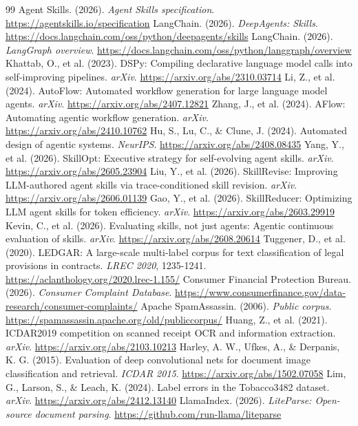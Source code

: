 \documentclass[9pt,a4paper,twocolumn]{article}
\begin{document}
\begin{thebibliography}{99}
 Agent Skills. (2026). \emph{Agent Skills specification}. \url{https://agentskills.io/specification}
 LangChain. (2026). \emph{DeepAgents: Skills}. \url{https://docs.langchain.com/oss/python/deepagents/skills}
 LangChain. (2026). \emph{LangGraph overview}. \url{https://docs.langchain.com/oss/python/langgraph/overview}
 Khattab, O., et al. (2023). DSPy: Compiling declarative language model calls into self-improving pipelines. \emph{arXiv}. \url{https://arxiv.org/abs/2310.03714}
 Li, Z., et al. (2024). AutoFlow: Automated workflow generation for large language model agents. \emph{arXiv}. \url{https://arxiv.org/abs/2407.12821}
 Zhang, J., et al. (2024). AFlow: Automating agentic workflow generation. \emph{arXiv}. \url{https://arxiv.org/abs/2410.10762}
 Hu, S., Lu, C., \& Clune, J. (2024). Automated design of agentic systems. \emph{NeurIPS}. \url{https://arxiv.org/abs/2408.08435}
 Yang, Y., et al. (2026). SkillOpt: Executive strategy for self-evolving agent skills. \emph{arXiv}. \url{https://arxiv.org/abs/2605.23904}
 Liu, Y., et al. (2026). SkillRevise: Improving LLM-authored agent skills via trace-conditioned skill revision. \emph{arXiv}. \url{https://arxiv.org/abs/2606.01139}
 Gao, Y., et al. (2026). SkillReducer: Optimizing LLM agent skills for token efficiency. \emph{arXiv}. \url{https://arxiv.org/abs/2603.29919}
 Kevin, C., et al. (2026). Evaluating skills, not just agents: Agentic continuous evaluation of skills. \emph{arXiv}. \url{https://arxiv.org/abs/2608.20614}
 Tuggener, D., et al. (2020). LEDGAR: A large-scale multi-label corpus for text classification of legal provisions in contracts. \emph{LREC 2020}, 1235-1241. \url{https://aclanthology.org/2020.lrec-1.155/}
 Consumer Financial Protection Bureau. (2026). \emph{Consumer Complaint Database}. \url{https://www.consumerfinance.gov/data-research/consumer-complaints/}
 Apache SpamAssassin. (2006). \emph{Public corpus}. \url{https://spamassassin.apache.org/old/publiccorpus/}
 Huang, Z., et al. (2021). ICDAR2019 competition on scanned receipt OCR and information extraction. \emph{arXiv}. \url{https://arxiv.org/abs/2103.10213}
 Harley, A. W., Ufkes, A., \& Derpanis, K. G. (2015). Evaluation of deep convolutional nets for document image classification and retrieval. \emph{ICDAR 2015}. \url{https://arxiv.org/abs/1502.07058}
 Lim, G., Larson, S., \& Leach, K. (2024). Label errors in the Tobacco3482 dataset. \emph{arXiv}. \url{https://arxiv.org/abs/2412.13140}
 LlamaIndex. (2026). \emph{LiteParse: Open-source document parsing}. \url{https://github.com/run-llama/liteparse}
\end{thebibliography}
\end{document}
